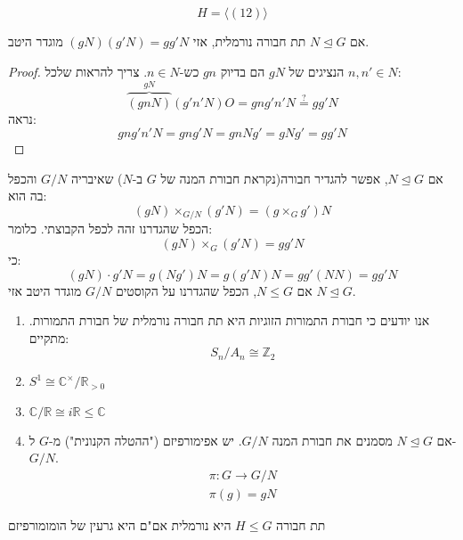 \documentclass{tstextbook}
\begin{document}
\begin{example}
$$H=\langle (12)\rangle$$

\end{example}
\begin{proposition}
אם \(N\trianglelefteq G\) תת חבורה נורמלית, אזי \((gN)(g'N)=gg'N\) מוגדר היטב.

\end{proposition}
\begin{proof}
הנציגים של \(gN\) הם בדיוק \(gn\) כש-\(n\in N\). צריך להראות שלכל \(n,n' \in N\):
$$\overbrace{ (gnN) }^{ gN }(g'n'N)O=gng'n'N\stackrel{?}{=} gg'N$$
נראה: 
$$gng'n'N=gng'N=gnNg'=gNg'=gg'N$$

\end{proof}
\begin{corollary}
אם \(N\trianglelefteq G\), אפשר להגדיר חבורה(נקראת חבורת המנה של \(G\) ב-\(N\)) שאיבריה \(G/N\) והכפל בה הוא:
$$(gN)\times_{G/N} (g'N)=\left( g\times_{G} g' \right)N$$
הכפל שהגדרנו זהה לכפל הקבוצתי. כלומר: $$(gN)\times_{G} (g'N)=gg'N$$ כי:
$$(gN)\cdot g'N=g(Ng')N=g(g'N)N=gg'(NN)=gg'N$$
אם \(N\leq G\), הכפל שהגדרנו על הקוסטים \(G/N\) מוגדר היטב אזי \(N\trianglelefteq G\).

\end{corollary}
\begin{example}
  \begin{enumerate}
    \item אנו יודעים כי חבורת התמורות הזוגיות היא תת חבורה נורמלית של חבורת התמורות. מתקיים: 
$$S_{n} / A_{n} \cong \mathbb{Z} _{2}$$


    \item \(S^1 \cong \mathbb{C} ^{\times } / \mathbb{R} _{>0}\)


    \item \(\mathbb{C} /\mathbb{R} \cong i\mathbb{R} \leq \mathbb{C}\)


    \item אם \(N\trianglelefteq G\) מסמנים את חבורת המנה \(G/N\). יש אפימורפיזם ("ההטלה הקנונית") מ-\(G\) ל- \(G / N\).\\
$$\begin{gathered}\pi:G\to G / N \\\pi(g)=gN
\end{gathered}$$


  \end{enumerate}
\end{example}
\begin{proposition}
תת חבורה \(H\leq G\) היא נורמלית אם"ם היא גרעין של הומומורפיזם

\end{proposition}
\end{document}
